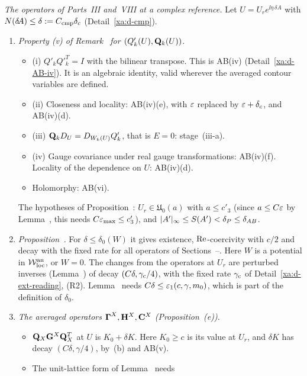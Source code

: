\begin{detail}
\emph{The operators of Parts~III and~VIII at a complex reference.} Let $U=U_re^{\ii\eta\,\delta\!A}$ with $N(\delta\!A)\le\delta:=C_{\rm cmp}\delta_c$ (Detail~\ref{xa:d-cmp}).
\begin{enumerate}[label=(\alph*)]
\item \emph{Property (v) of Remark~ for $(Q'_k(U),\mathbf Q_k(U))$.}
  \begin{itemize}
  \item (i) $Q'_kQ'^T_k=I$ with the bilinear transpose. This is AB(iv) (Detail~\ref{xa:d-AB-iv}). It is an algebraic identity, valid wherever the averaged contour variables are defined.
  \item (ii) Closeness and locality: AB(iv)(e), with $\varepsilon$ replaced by $\varepsilon+\delta_c$, and AB(iv)(d).
  \item (iii) $\mathbf Q_kD_U=D_{W_k(U)}Q'_k$, that is $E=0$: stage~(iii-a).
  \item (iv) Gauge covariance under real gauge transformations: AB(iv)(f). Locality of the dependence on $U$: AB(iv)(d).
  \item Holomorphy: AB(vi).
  \end{itemize}
  The hypotheses of Proposition~: $U_r\in\mathfrak U_0(a)$ with $a\le c'_3$ (since $a\le C\varepsilon$ by Lemma~, this needs $C\varepsilon_{\max}\le c'_3$), and $\lvert A'\rvert_\infty\le S(A')<\delta_P\le\delta_{AB}$.
\item \emph{Proposition~.} For $\delta\le\delta_0(W)$ it gives existence, $\operatorname{Re}$-coercivity with $c/2$ and decay with the fixed rate for all operators of Sections~--. Here $W$ is a potential in $\mathcal W^{\rm an}_{\rm loc}$, or $W=0$. The changes from the operators at $U_r$ are perturbed inverses (Lemma~) of decay $(C\delta,\gamma_{\rm c}/4)$, with the fixed rate $\gamma_{\rm c}$ of Detail~\ref{xa:d-ext-reading}, (R2). Lemma~ needs $C\delta\le\varepsilon_1(c,\gamma,m_0)$, which is part of the definition of $\delta_0$.
\item \emph{The averaged operators $\boldsymbol\Gamma^X,\mathbf H^X,\mathbf C^X$ (Proposition~(e)).}
  \begin{itemize}
  \item $\mathbf Q_X\mathbf G^X\mathbf Q_X^T$ at $U$ is $K_0+\delta K$. Here $K_0\ge c$ is its value at $U_r$, and $\delta K$ has decay $(C\delta,\gamma/4)$, by~(b) and AB(v).
  \item The unit-lattice form of Lemma~ needs

\end{itemize}
\end{enumerate}
\end{detail}
